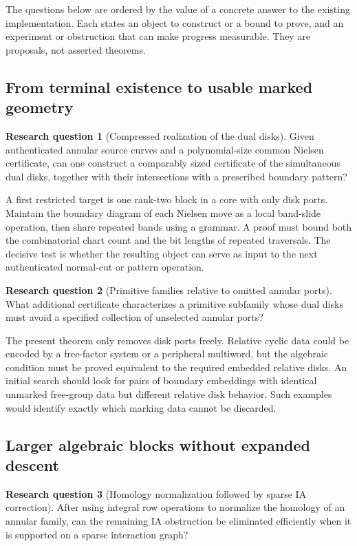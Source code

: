 \documentclass[11pt,a4paper]{article}
\theoremstyle{definition}
\newtheorem{question}{Research question}
\theoremstyle{remark}
\begin{document}
The questions below are ordered by the value of a concrete answer to the
existing implementation. Each states an object to construct or a bound to
prove, and an experiment or obstruction that can make progress measurable.
They are proposals, not asserted theorems.

\subsection{From terminal existence to usable marked geometry}

\begin{question}[Compressed realization of the dual disks]
Given authenticated annular source curves and a polynomial-size common
Nielsen certificate, can one construct a comparably sized certificate of
the simultaneous dual disks, together with their intersections with a
prescribed boundary pattern?
\end{question}

A first restricted target is one rank-two block in a core with only disk
ports. Maintain the boundary diagram of each Nielsen move as a local
band-slide operation, then share repeated bands using a grammar. A proof
must bound both the combinatorial chart count and the bit lengths of
repeated traversals. The decisive test is whether the resulting object can
serve as input to the next authenticated normal-cut or pattern operation.

\begin{question}[Primitive families relative to omitted annular ports]
What additional certificate characterizes a primitive subfamily whose dual
disks must avoid a specified collection of unselected annular ports?
\end{question}

The present theorem only removes disk ports freely. Relative cyclic data
could be encoded by a free-factor system or a peripheral multiword, but
the algebraic condition must be proved equivalent to the required embedded
relative disks. An initial search should look for pairs of boundary
embeddings with identical unmarked free-group data but different relative
disk behavior. Such examples would identify exactly which marking data
cannot be discarded.

\subsection{Larger algebraic blocks without expanded descent}

\begin{question}[Homology normalization followed by sparse IA correction]
After using integral row operations to normalize the homology of an
annular family, can the remaining IA obstruction be eliminated efficiently
when it is supported on a sparse interaction graph?
\end{question}
\end{document}
